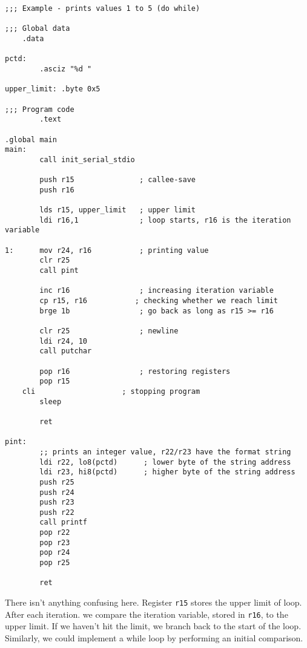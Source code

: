 \lstset{
caption=Assembly: Do-While Loop
}

\begin{lstlisting}
;;; Example - prints values 1 to 5 (do while)

;;; Global data
    .data

pctd:
        .asciz "%d "         

upper_limit: .byte 0x5              

;;; Program code
        .text                 

.global main                  
main:                          
        call init_serial_stdio

        push r15               ; callee-save 
        push r16               

        lds r15, upper_limit   ; upper limit
        ldi r16,1              ; loop starts, r16 is the iteration variable

1:      mov r24, r16           ; printing value
        clr r25                
        call pint

        inc r16                ; increasing iteration variable
        cp r15, r16           ; checking whether we reach limit
        brge 1b                ; go back as long as r15 >= r16

        clr r25                ; newline
        ldi r24, 10            
        call putchar
    
        pop r16                ; restoring registers
        pop r15
    cli                    ; stopping program
        sleep                          

        ret                    

pint:
        ;; prints an integer value, r22/r23 have the format string
        ldi r22, lo8(pctd)      ; lower byte of the string address
        ldi r23, hi8(pctd)      ; higher byte of the string address
        push r25
        push r24
        push r23
        push r22
        call printf
        pop r22
        pop r23
        pop r24
        pop r25

        ret
\end{lstlisting}

There isn't anything confusing here. Register \verb!r15! stores the upper limit of loop. After each iteration. we compare the iteration variable, stored in \verb!r16!, to the upper limit. If we haven't hit the limit, we branch back to the start of the loop. Similarly, we could implement a while loop by performing an initial comparison.